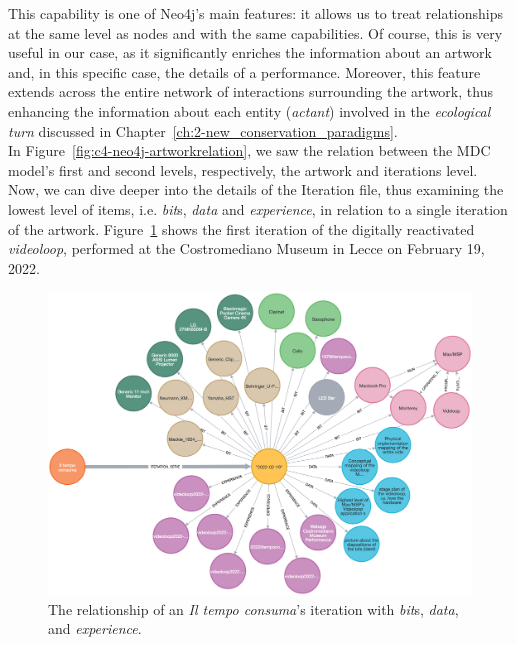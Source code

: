 This capability is one of Neo4j's main features: it allows us to treat relationships at the same level as nodes and with the same capabilities. Of course, this is very useful in our case, as it significantly enriches the information about an artwork and, in this specific case, the details of a performance. Moreover, this feature extends across the entire network of interactions surrounding the artwork, thus enhancing the information about each entity (\textit{actant}) involved in the \textit{ecological turn} discussed in Chapter~\ref{ch:2-new_conservation_paradigms}.\\
In Figure~\ref{fig:c4-neo4j-artworkrelation}, we saw the relation between the MDC model's first and second levels, respectively, the artwork and iterations level. Now, we can dive deeper into the details of the Iteration file, thus examining the lowest level of items, i.e. \textit{bit}s, \textit{data} and \textit{experience}, in relation to a single iteration of the artwork. Figure~\ref{fig:c4-neo4j-iteration} shows the first iteration of the digitally reactivated \textit{videoloop}, performed at the Costromediano Museum in Lecce on February 19, 2022.

\begin{figure}[!h]
    \centering
    \includegraphics[width=1\linewidth]{chapters/4-MDC_model_application/image/neo4j-iteration.png}
    \caption{The relationship of an \textit{Il tempo consuma}'s iteration with \textit{bit}s, \textit{data}, and \textit{experience}.}
    \label{fig:c4-neo4j-iteration}
\end{figure}


